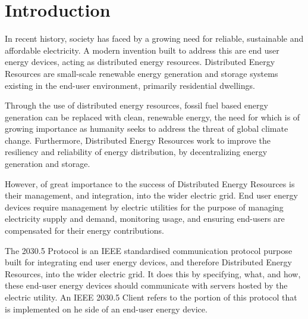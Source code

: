 \chapter{Introduction}\label{ch:intro}
In recent history, society has faced by a growing need for reliable, sustainable and affordable electricity.
A modern invention built to address this are end user energy devices, acting as distributed energy resources. 
Distributed Energy Resources are small-scale renewable energy generation and storage systems existing in the end-user environment, primarily residential dwellings.

Through the use of distributed energy resources, fossil fuel based energy generation can be replaced with clean, 
renewable energy, the need for which is of growing importance as humanity seeks to address the threat of global climate change.
Furthermore, Distributed Energy Resources work to improve the resiliency and reliability of energy distribution, by decentralizing energy generation and storage.

However, of great importance to the success of Distributed Energy Resources is their management, and integration, into the wider electric grid.
End user energy devices require management by electric utilities for the purpose of managing electricity supply and demand, monitoring usage, 
and ensuring end-users are compensated for their energy contributions.

The 2030.5 Protocol is an IEEE standardised communication protocol purpose built for integrating end user energy devices, and therefore Distributed Energy Resources, into the wider electric grid.
It does this by specifying, what, and how, these end-user energy devices should communicate with servers hosted by the electric utility. 
An IEEE 2030.5 Client refers to the portion of this protocol that is implemented on he side of an end-user energy device.


